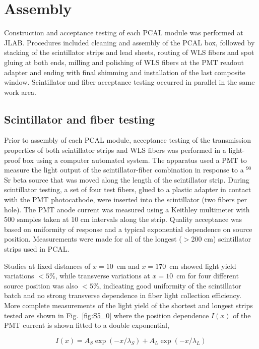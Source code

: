 \section{Assembly}
Construction and acceptance testing of each PCAL module was performed at JLAB.  Procedures included cleaning and assembly of the PCAL box, followed by stacking of the scintillator strips and lead sheets, routing of WLS fibers and spot gluing at both ends, milling and polishing of WLS fibers at the PMT readout adapter and ending with final shimming and installation of the last composite window.  Scintillator and fiber acceptance testing occurred in parallel in the same work area.


\subsection{Scintillator and fiber testing}
Prior to assembly of each PCAL module, acceptance testing of the transmission properties of both scintillator strips and WLS fibers was performed in a light-proof box using a computer automated system.  The apparatus used a PMT to measure the light output of the scintillator-fiber combination in response to a $^{90}$Sr beta source that was moved along the length of the scintillator strip. During scintillator testing, a set of four test fibers, glued to a plastic adapter in contact with the PMT photocathode, were inserted into the scintillator (two fibers per hole).  The PMT anode current was measured using a Keithley multimeter with 500 samples taken at 10 cm intervals along the strip.  Quality acceptance was based on uniformity of response and a typical exponential dependence on source position. Measurements were made for all of the longest ($>$200 cm) scintillator strips used in PCAL.

Studies at fixed distances of $x=10$~cm and $x=170$~cm showed light yield variations $<5\%$, while transverse variations at $x=10$~cm for four different source  position was also $<5\%$, indicating good uniformity of the scintillator batch and no strong transverse dependence in fiber light collection efficiency.  More complete measurements of the light yield of the shortest and longest strips tested are shown in Fig.~\ref{fig:S5_0} where the position dependence $I(x)$ of the PMT current is shown fitted to a double exponential,

\begin{equation}
I(x) = A_S \exp(-x/\lambda_S)+A_L \exp(-x/\lambda_L)
\end{equation}

